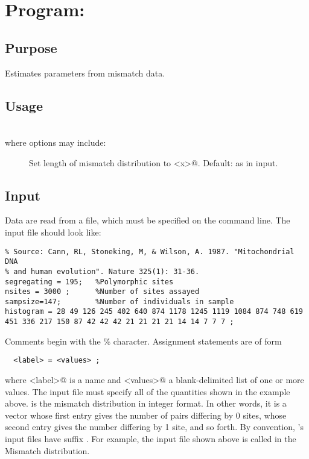 \chapter{Program: \label{ch.mmest}}

\section{Purpose} Estimates parameters from mismatch data.

\section{Usage} \\
where options may include:
\begin{description}
\item[] Set length of mismatch distribution to
\verb@<x>@. Default: as in input.
\end{description}

\section{Input} Data are read from a file, which must be specified
on the command line.  The input file should look like:
\begin{verbatim}
% Source: Cann, RL, Stoneking, M, & Wilson, A. 1987. "Mitochondrial DNA
% and human evolution". Nature 325(1): 31-36.
segregating = 195;   %Polymorphic sites
nsites = 3000 ;      %Number of sites assayed
sampsize=147;        %Number of individuals in sample
histogram = 28 49 126 245 402 640 874 1178 1245 1119 1084 874 748 619
451 336 217 150 87 42 42 42 21 21 21 21 14 14 7 7 7 ;
\end{verbatim}
Comments begin with the \% character.  Assignment statements are of
form
\begin{verbatim}
  <label> = <values> ;
\end{verbatim}
where \verb@<label>@ is a name and \verb@<values>@ a blank-delimited
list of one or more values.  The input file must specify all of the
quantities shown in the example above.   is the mismatch
distribution in integer format.  In other words, it is a vector whose
first entry gives the number of pairs differing by 0 sites, whose
second entry gives the number differing by 1 site, and so forth.  By
convention, 's input files have suffix .  For
example, the input file shown above is called  in the
Mismatch distribution.


